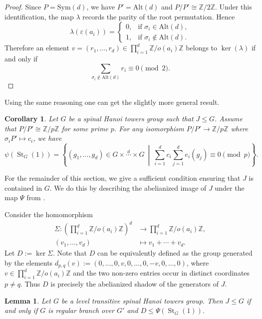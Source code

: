 \documentclass[11pt,leqno]{amsart}
\theoremstyle{plain}
\newtheorem{corollary}[corollary]{Corollary}
\newtheorem{lemma}[lemma]{Lemma}
\DeclareMathOperator{\St}{St}
\newcommand{\alt}{\mathrm{Alt}}
\newcommand{\Sym}{\mathrm{Sym}}
\numberwithin{equation}{section}
\begin{document}
\begin{proof}
	Since $P=\Sym(d)$, we have $P'=\alt(d)$ and $P/P'\cong \mathbb Z/2\mathbb Z$. Under this identification, the map $\lambda$ records the parity of the root permutation. Hence
	\[
	\lambda(\varepsilon(a_i))=
	\begin{cases}
		0, & \text{if } \sigma_i\in \alt(d),\\
		1, & \text{if } \sigma_i\notin \alt(d).
	\end{cases}
	\]
	Therefore an element $v=(r_1,\ldots,r_d)\in \prod_{i=1}^d \mathbb Z/o(a_i)\mathbb Z$ belongs to $\ker(\lambda)$ if and only if
	\[
	\sum_{\sigma_i\notin \alt(d)} r_i\equiv 0 \pmod 2.
	\]
\end{proof}

Using the same reasoning one can get the slightly more general result.
\begin{corollary}\label{cor:rem}
	Let $G$ be a spinal Hanoi towers group such that $J\leq G$. Assume that $P/P'\cong \mathbb Z/p\mathbb Z$ for some prime $p$. For any isomorphism $P/P'\to \mathbb Z/p\mathbb Z$ where $\sigma_iP'\mapsto c_i$, we have
		\[
	\psi(\St_G(1))
	=
	\left\{
	(g_1,\ldots,g_d)\in G\times \stackrel{d}{\cdots}\times G
	\ \middle|\
	\sum_{i=1}^d c_i\sum_{j=1}^d e_i(g_j)\equiv0 \pmod p
	\right\}.
	\]
\end{corollary}
For the remainder of this section, we give a sufficient condition ensuring that $J$ is contained in $G$. We do this by describing the abelianized image of $J$ under the map $\Psi$ from .


Consider the homomorphism
\begin{align} \label{summap}
    \Sigma:\left(\prod_{i=1}^d \mathbb Z/o(a_i)\mathbb Z\right)^d
    &\longrightarrow \prod_{i=1}^d \mathbb Z/o(a_i)\mathbb Z,\\
    (v_1,\ldots,v_d)&\longmapsto v_1+\cdots+v_d.\nonumber
\end{align}
Let $D:=\ker \Sigma$. Note that $D$ can be equivalently defined as the group generated by the elements
$d_{p,q}(v):=(0,\ldots,0,v,0,\ldots,0,-v,0,\ldots,0)$,
where $v\in \prod_{i=1}^d \mathbb Z/o(a_i)\mathbb Z$ and the two non-zero entries occur in distinct coordinates $p\neq q$. Thus $D$ is precisely the abelianized shadow of the generators of $J$.

\begin{lemma}\label{Transfer}
    Let $G$ be a level transitive spinal Hanoi towers group. Then $J\leq G$ if and only if $G$ is regular branch over $G'$ and $D\leq \Psi(\St_G(1))$. 
\end{lemma}
\end{document}
